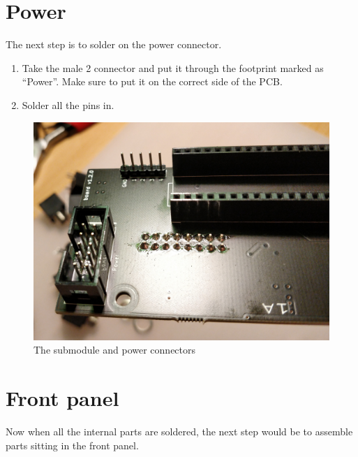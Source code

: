 \documentclass[10pt,a4paper,twocolumn]{article}
\begin{document}
\section{Power}

The next step is to solder on the power connector.

\begin{enumerate}
  \item Take the male 2 connector and put it through the footprint marked as ``Power''. Make sure to put it on the correct side of the PCB.
  \item Solder all the pins in.
\end{enumerate}

\begin{figure}[p]
  \centering
  \includegraphics[width=\linewidth]{p05.jpg}
  \caption{The submodule and power connectors}
  \label{connectors}
\end{figure}

\clearpage

\section{Front panel}

Now when all the internal parts are soldered, the next step would be to assemble parts sitting in the front panel.
\end{document}
